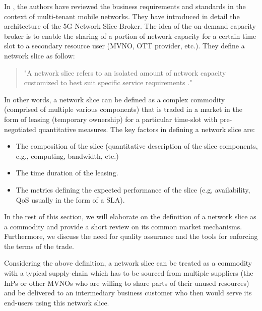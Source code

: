 In \cite{7514161}, the authors have reviewed the business requirements and standards in the context of multi-tenant mobile networks. They have introduced in detail the architecture of the \ac{5G} Network Slice Broker. The idea of the on-demand capacity broker is to enable the sharing of a portion of network capacity for a certain time slot to a secondary resource user (MVNO, OTT provider, etc.). They define a network slice as follow:
\begin{quote}
    "A network slice refers to an isolated amount of network capacity customized to best suit specific service requirements \cite{7514161}."
\end{quote}
In other words, a network slice can be defined as a complex commodity (comprised of multiple various components) that is traded in a market in the form of leasing (temporary ownership) for a particular time-slot with pre-negotiated quantitative measures. The key factors in defining a network slice are:
\begin{itemize}
    \item The composition of the slice (quantitative description of the slice components, e.g., computing, bandwidth, etc.)
    \item The time duration of the leasing.
    \item The metrics defining the expected performance of the slice (e.g, availability, \ac{QoS} usually in the form of a \ac{SLA}).
\end{itemize}

In the rest of this section, we will elaborate on the definition of a network slice as a commodity and provide a short review on its common market mechanisms. Furthermore, we discuss the need for quality assurance and the tools for enforcing the terms of the trade. 

Considering the above definition, a network slice can be treated as a commodity with a typical supply-chain which has to be sourced from multiple suppliers (the \acp{InP} or other \acp{MVNO} who are willing to share parts of their unused resources) and be delivered to an intermediary business customer who then would serve its end-users using this network slice.

